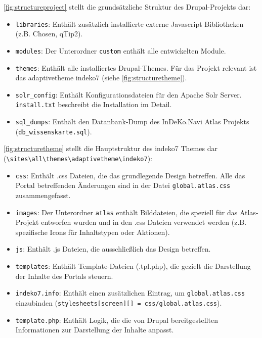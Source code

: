 \cref{fig:structureproject} stellt die grundsätzliche Struktur des Drupal-Projekts dar:
\begin{itemize}
	\item \lstinline|libraries|: Enthält zusätzlich installierte externe Javascript Bibliotheken (z.B. Chosen, qTip2).
	
	\item \lstinline|modules|: Der Unterordner \lstinline|custom| enthält alle entwickelten Module.
	
	\item \lstinline|themes|: Enthält alle installiertes Drupal-Themes. Für das Projekt relevant ist das adaptivetheme indeko7 (siehe \cref{fig:structuretheme}).
	
	\item \lstinline|solr_config|: Enthält Konfigurationsdateien für den Apache Solr Server. \lstinline|install.txt| beschreibt die Installation im Detail.
	
	\item \lstinline|sql_dumps|: Enthält den Datanbank-Dump des InDeKo.Navi Atlas Projekts  (\lstinline|db_wissenskarte.sql|).
\end{itemize}



\cref{fig:structuretheme} stellt die Hauptstruktur des indeko7 Themes dar (\lstinline|\sites\all\themes\adaptivetheme\indeko7|):
\begin{itemize}
	\item \lstinline|css|: Enthält .css Dateien, die das grundlegende Design betreffen. Alle das Portal betreffenden Änderungen sind in der Datei \lstinline|global.atlas.css| zusammengefasst.
	
	\item \lstinline|images|: Der Unterordner \lstinline|atlas| enthält Bilddateien, die speziell für das Atlas-Projekt entworfen wurden und in den .css Dateien verwendet werden (z.B. spezifische Icons für Inhaltstypen oder Aktionen).
	
	\item \lstinline|js|: Enthält .js Dateien, die ausschließlich das Design betreffen. 
	
	\item \lstinline|templates|: Enthält Template-Dateien (.tpl.php), die gezielt die Darstellung der Inhalte des Portals steuern.
	
	\item \lstinline|indeko7.info|: Enthält einen zusätzlichen Eintrag, um \lstinline|global.atlas.css| einzubinden (\lstinline|stylesheets[screen][] = css/global.atlas.css|).
	
	\item \lstinline|template.php|: Enthält Logik, die die von Drupal bereitgestellten Informationen zur Darstellung der Inhalte anpasst.
	
\end{itemize}



